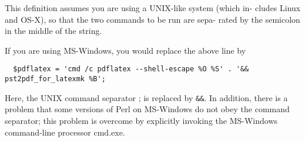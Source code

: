 This definition assumes you are using a  UNIX-like  system  (which  in-
cludes  Linux  and  OS-X), so that the two commands to be run are sepa-
rated by the semicolon in the middle of the string.

If you are using MS-Windows, you would replace the above line by

\begin{verbatim}
  $pdflatex = 'cmd /c pdflatex --shell-escape %O %S' . '&& pst2pdf_for_latexmk %B';
\end{verbatim}

Here, the UNIX command separator ; is replaced  by  \verb|&&|.   In  addition,
there is a problem that some versions of Perl on MS-Windows do not obey
the command separator; this problem is overcome by explicitly  invoking
the MS-Windows command-line processor cmd.exe.

